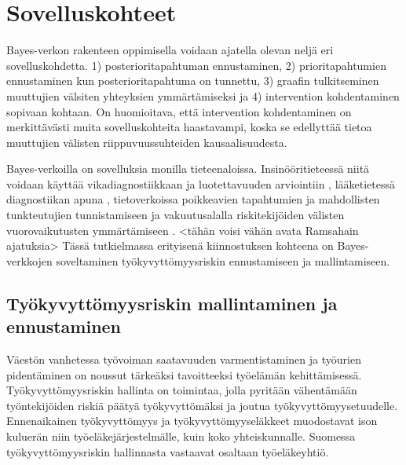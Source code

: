 \chapter{Sovelluskohteet\label{applications}}
Bayes-verkon rakenteen oppimisella voidaan ajatella olevan neljä eri sovelluskohdetta. 1) posterioritapahtuman ennustaminen, 2) prioritapahtumien ennustaminen kun posterioritapahtuma on tunnettu, 3) graafin tulkitseminen muuttujien välsiten yhteyksien ymmärtämiseksi ja 4) intervention kohdentaminen sopivaan kohtaan. On huomioitava, että intervention kohdentaminen on merkittävästi muita sovelluskohteita haastavampi, koska se edellyttää tietoa muuttujien välisten riippuvuussuhteiden kausaalisuudesta.

Bayes-verkoilla on sovelluksia monilla tieteenaloissa. Insinööritieteessä niitä voidaan käyttää vikadiagnostiikkaan ja luotettavuuden arviointiin \citep{zhang_brief_2019}, lääketietessä diagnostiikan apuna \citep{mittal_review_2011}, tietoverkoissa poikkeavien tapahtumien ja mahdollisten tunkteutujien tunnistamiseen \citep{kaur_review_2013} ja vakuutusalalla riskitekijöiden välisten vuorovaikutusten ymmärtämiseen \citep{ramsahai_connecting_2020}. <tähän voisi vähän avata Ramsahain ajatuksia> Tässä tutkielmassa erityisenä kiinnostuksen kohteena on Bayes-verkkojen soveltaminen työkyvyttömyysriskin ennustamiseen ja mallintamiseen.

\section{Työkyvyttömyysriskin mallintaminen ja ennustaminen}

Väestön vanhetessa työvoiman saatavuuden varmentistaminen ja työurien pidentäminen on noussut tärkeäksi tavoitteeksi työelämän kehittämisessä. Työkyvyttömyysriskin hallinta on toimintaa, jolla pyritään vähentämään työntekijöiden riskiä päätyä työkyvyttömäksi ja joutua työkyvyttömyysetuudelle. Ennenaikainen työkyvyttömyys ja työkyvyttömyyseläkkeet muodostavat ison kuluerän niin työeläkejärjestelmälle, kuin koko yhteiskunnalle. Suomessa työkyvyttömyysriskin hallinnasta vastaavat osaltaan työeläkeyhtiö.

